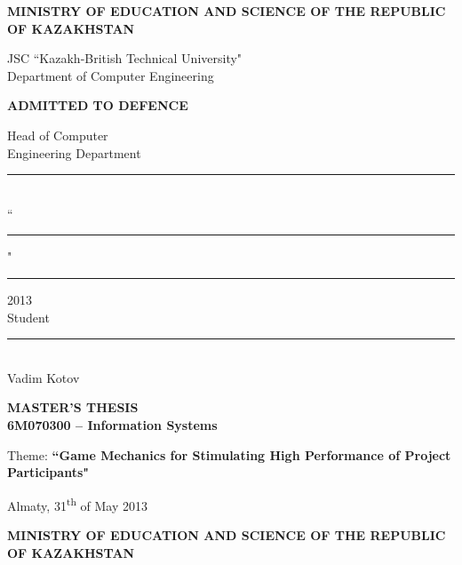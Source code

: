\begin{titlepage}
	\pagestyle{empty}
	\begin{center}
		{\bf{\MakeUppercase{Ministry of education and science of the republic of Kazakhstan}}

		\vspace{14pt}

		JSC ``Kazakh-British Technical University"\\
		Department of Computer Engineering}

		\begin{flushright}
			{\bf \MakeUppercase{Admitted to defence}}

			Head of Computer\\
			Engineering Department\\
			\vspace{0.5\baselineskip}
			\rule{13em}{0.4pt}\\

			\vspace{0.5\baselineskip}
			``\rule{2em}{0.4pt}" \rule{8em}{0.4pt} 2013\\
			
			\vspace{1.5\baselineskip}
           Student 
           \vspace{0.5\baselineskip}
           \rule{13em}{0.4pt}\\
           Vadim Kotov
		\end{flushright}
		
		{\bf
		\MakeUppercase{Master's Thesis}\\
		6M070300 -- Information Systems}

		\vspace{14pt}

		Theme: {\bf ``Game Mechanics for Stimulating High Performance of Project Participants"}

	\end{center}


	\begin{center}
		\vfill
		Almaty, 31\textsuperscript{th} of May 2013
	\end{center}

	\pagebreak


	\begin{center}
	{\bf{\MakeUppercase{Ministry of education and science of the republic of Kazakhstan}}

		\vspace{14pt}

}
\end{center}
\end{titlepage}
